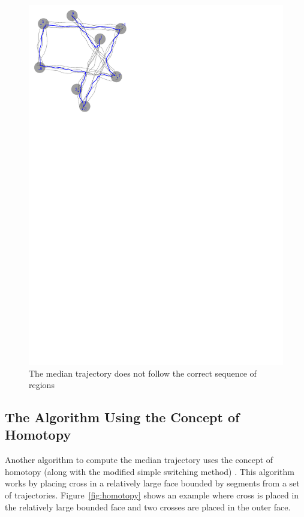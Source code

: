 \begin{figure}
\centering
\includegraphics[scale=1]{Gambar/switch_fail3}
\caption[The median trajectory follows incorrect direction \cite{Lionov:2009}]{The median trajectory does not follow the correct sequence of regions \cite{Lionov:2009}} 
\label{fig:switch_fail3}
\end{figure} 
 
\subsection{The Algorithm Using the Concept of Homotopy}
\label{sec:homotopy}

Another algorithm to compute the median trajectory uses the concept of homotopy (along with the modified simple switching method) \cite{Buchin:2010}.
This algorithm works by placing cross in a relatively large face bounded by segments from a set of trajectories.
Figure~\ref{fig:homotopy} shows an example where cross is placed in the relatively large bounded face and two crosses are placed in the outer face.

